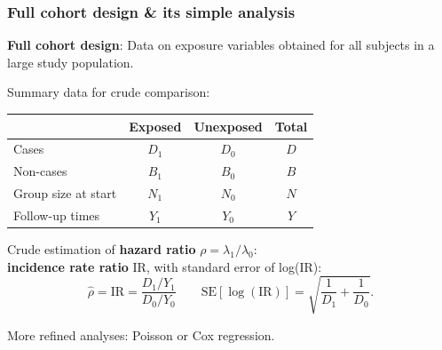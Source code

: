 \documentclass[12pt,dvipsnames,t,handout%
,aspectratio=169%
]{beamer}
\begin{document}
\begin{frame}
\frametitle{Full cohort design \& its simple analysis}

\bi
\item
{\bf Full cohort design}: Data on exposure variables 
obtained for all subjects in a large study population.
\pause
\medskip
\item
Summary data for crude comparison:
\medskip
\begin{center}
\begin{tabular}{lccc}
\hline
          &  Exposed  &  Unexposed & Total\\
\hline
 Cases     &   $D_{1}$ &    $D_{0}$ & $D$ \\
 Non-cases  &  $B_{1}$  &  $B_{0}$  & $B$ \\
\hline    
 Group size at start  &  $N_{1}$  &  $N_{0}$ & $N$ \\
 Follow-up times      &  $Y_1 $ & $Y_0$  & $Y$\\ 
\hline 
\end{tabular}
\end{center}
\pause
\bigskip
\item  
Crude estimation of {\bf hazard ratio} $\rho = \lambda_1/\lambda_0$: \\
{\bf incidence rate ratio} IR, with standard error of log(IR):
$$ \widehat\rho = \text{IR} %
   = \frac{ D_1/Y_1}{D_0/Y_0}  \qquad
  \text{SE}[\log(\text{IR})]  =  \sqrt{\frac{1}{D_1} + \frac{1}{D_0} }.
$$  
\item More refined analyses: Poisson or Cox regression.
\ei

\end{frame}
\end{document}
